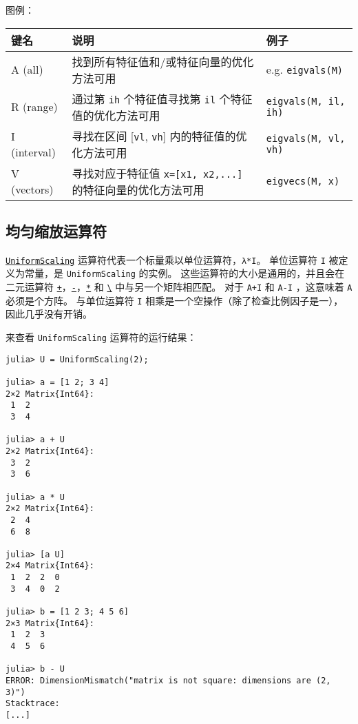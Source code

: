 图例：




\begin{table}[h]

\begin{tabulary}{\linewidth}{|L|L|L|}
\hline
键名 & 说明 & 例子 \\
\hline
A (all) & 找到所有特征值和/或特征向量的优化方法可用 & e.g. \texttt{eigvals(M)} \\
\hline
R (range) & 通过第 \texttt{ih} 个特征值寻找第 \texttt{il} 个特征值的优化方法可用 & \texttt{eigvals(M, il, ih)} \\
\hline
I (interval) & 寻找在区间 [\texttt{vl}, \texttt{vh}] 内的特征值的优化方法可用 & \texttt{eigvals(M, vl, vh)} \\
\hline
V (vectors) & 寻找对应于特征值 \texttt{x=[x1, x2,...]} 的特征向量的优化方法可用 & \texttt{eigvecs(M, x)} \\
\hline
\end{tabulary}

\end{table}



\hypertarget{1112864139503744598}{}


\subsection{均匀缩放运算符}



\hyperlink{723087258311673942}{\texttt{UniformScaling}} 运算符代表一个标量乘以单位运算符，\texttt{λ*I}。 单位运算符 \texttt{I} 被定义为常量，是 \texttt{UniformScaling} 的实例。 这些运算符的大小是通用的，并且会在二元运算符 \hyperlink{3677358729494553841}{\texttt{+}}，\hyperlink{8228207173393714756}{\texttt{-}}，\hyperlink{5498506958944335098}{\texttt{*}} 和 \hyperlink{2092789550033334797}{\texttt{{\textbackslash}}} 中与另一个矩阵相匹配。 对于 \texttt{A+I} 和 \texttt{A-I} ，这意味着 \texttt{A} 必须是个方阵。 与单位运算符 \texttt{I} 相乘是一个空操作（除了检查比例因子是一），因此几乎没有开销。



来查看 \texttt{UniformScaling} 运算符的运行结果：




\begin{verbatim}
julia> U = UniformScaling(2);

julia> a = [1 2; 3 4]
2×2 Matrix{Int64}:
 1  2
 3  4

julia> a + U
2×2 Matrix{Int64}:
 3  2
 3  6

julia> a * U
2×2 Matrix{Int64}:
 2  4
 6  8

julia> [a U]
2×4 Matrix{Int64}:
 1  2  2  0
 3  4  0  2

julia> b = [1 2 3; 4 5 6]
2×3 Matrix{Int64}:
 1  2  3
 4  5  6

julia> b - U
ERROR: DimensionMismatch("matrix is not square: dimensions are (2, 3)")
Stacktrace:
[...]
\end{verbatim}



